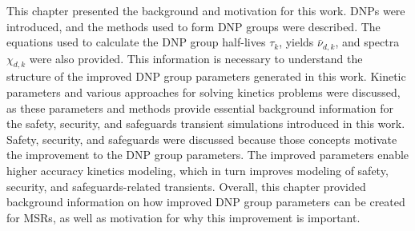 This chapter presented the background and motivation for this work.
\Glspl{DNP} were introduced, and the methods used to form \gls{DNP} groups were described.
The equations used to calculate the \gls{DNP} group half-lives $\tau_k$, yields $\bar{\nu}_{d,k}$, and spectra $\chi_{d,k}$ were also provided.
This information is necessary to understand the structure of the improved \gls{DNP} group parameters generated in this work.
Kinetic parameters and various approaches for solving kinetics problems were discussed, as these parameters and methods provide essential background information for the safety, security, and safeguards transient simulations introduced in this work.
Safety, security, and safeguards were discussed because those concepts motivate the improvement to the \gls{DNP} group parameters.
The improved parameters enable higher accuracy kinetics modeling, which in turn improves modeling of safety, security, and safeguards-related transients.
Overall, this chapter provided background information on how improved \gls{DNP} group parameters can be created for \glspl{MSR}, as well as motivation for why this improvement is important.